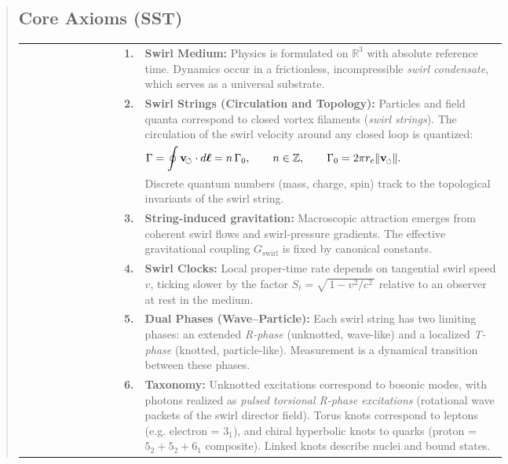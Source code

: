 \documentclass[10pt,reprint,aps,onecolumn,nofootinbib]{revtex4-2}
\newcommand{\vswirl}{\mathbf{v}_{\!\boldsymbol{\circlearrowleft}}}
\newcommand{\vnorm}{\lVert \mathbf{v}_{\mkern-2mu\scriptscriptstyle\boldsymbol{\circlearrowleft}} \rVert}               %
\begin{document}
\begin{abstract}
    \subsection*{Core Axioms (SST)}
        \begin{tabular}{r@{\quad}p{0.75\linewidth}}
            \textbf{1.} & \textbf{Swirl Medium:} Physics is formulated on $\mathbb{R}^3$ with absolute reference time. Dynamics occur in a frictionless, incompressible \emph{swirl condensate}, which serves as a universal substrate. \\
            \textbf{2.} & \textbf{Swirl Strings (Circulation and Topology):} Particles and field quanta correspond to closed vortex filaments (\emph{swirl strings}). The circulation of the swirl velocity around any closed loop is quantized: \\
            & $\displaystyle \Gamma = \oint \vswirl \cdot d\boldsymbol{\ell} = n\,\Gamma_0,\qquad n\in\mathbb{Z},\qquad \Gamma_0 = 2\pi r_c \vnorm.$ \\
            & Discrete quantum numbers (mass, charge, spin) track to the topological invariants of the swirl string. \\
            \textbf{3.} & \textbf{String-induced gravitation:} Macroscopic attraction emerges from coherent swirl flows and swirl-pressure gradients. The effective gravitational coupling $G_{\text{swirl}}$ is fixed by canonical constants. \\
            \textbf{4.} & \textbf{Swirl Clocks:} Local proper-time rate depends on tangential swirl speed $v$, ticking slower by the factor $S_t=\sqrt{\,1-v^2/c^2\,}$ relative to an observer at rest in the medium. \\
            \textbf{5.} & \textbf{Dual Phases (Wave–Particle):} Each swirl string has two limiting phases: an extended \emph{R-phase} (unknotted, wave-like) and a localized \emph{T-phase} (knotted, particle-like). Measurement is a dynamical transition between these phases. \\
            \textbf{6.} & \textbf{Taxonomy:} Unknotted excitations correspond to bosonic modes,
            with photons realized as \emph{pulsed torsional R-phase excitations} (rotational wave packets of the swirl director field). Torus knots correspond to leptons (e.g. electron = $3_1$), and chiral hyperbolic knots to quarks (proton = $5_2+5_2+6_1$ composite). Linked knots describe nuclei and bound states. \\

\end{tabular}
\end{abstract}
\end{document}

